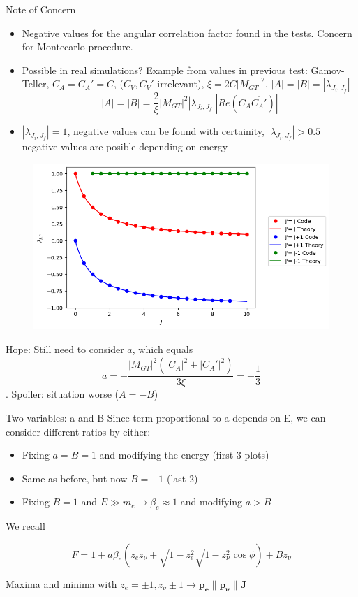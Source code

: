 \documentclass{beamer}
\begin{document}
\begin{frame}{Note of Concern}
	\begin{itemize}
		\item Negative values for the angular correlation factor found in the tests. Concern for Montecarlo procedure.
		\item Possible in real simulations? Example from values in previous test:
		Gamov-Teller, $C_A = C_A' = C$, ($C_V, C_V'$ irrelevant), $\xi=2C|M_{GT}|^2$, $|A| = |B| = |\lambda_{J_i,J_f}|$ 
		$$|A| = |B| = \frac{2}{\xi}|M_{GT}|^2|\lambda_{J_i,J_f}||Re(C_A\overline{C_A'})|$$
		\item $|\lambda_{J_i,J_f}| = 1$, negative values can be found with certainity, $|\lambda_{J_i,J_f}| > 0.5$ negative values are posible depending on energy

	\end{itemize}
\end{frame}
\begin{frame}
	\begin{figure}
		\centering
		\includegraphics[height=0.5\paperheight]{plots/lambda_test_result.png}
	\end{figure}
	 Hope: Still need to consider $a$, which equals 
	 $$a = -\frac{|M_{GT}|^2(|C_A|^2+|C_A'|^2)}{3\xi}=-\frac13$$. 
	 Spoiler: situation worse ($A=-B$)
\end{frame}
\begin{frame}{Two variables: a and B}
	Since term proportional to a depends on E, we can consider different ratios by either:
	\begin{itemize}
		\item Fixing $a = B = 1$ and modifying the energy (first 3 plots)
		\item Same as before, but now $B = -1$ (last 2)
		\item Fixing $B = 1$ and $E \gg m_e \rightarrow \beta_e \approx 1$ and modifying $a > B$
	\end{itemize}
	
	We recall
	
	$$F = 1 + a\beta_e(z_ez_\nu + \sqrt{1-z^2_e}\sqrt{1-z^2_\nu}\cos \phi) + Bz_\nu$$
	
	Maxima and minima with $z_e=\pm1,z_\nu \pm1 \rightarrow \boldsymbol{p_e} \parallel \boldsymbol{p_\nu} \parallel \boldsymbol{J}$  
	
\end{frame}
\end{document}
